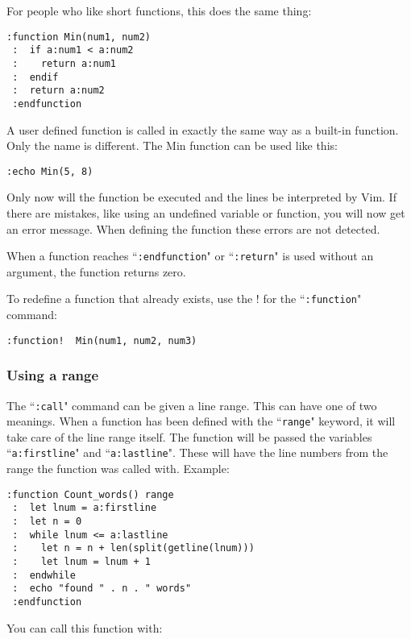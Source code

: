 For people who like short functions, this does the same thing:

\begin{Verbatim}[samepage=true]
 :function Min(num1, num2)
 :  if a:num1 < a:num2
 :    return a:num1
 :  endif
 :  return a:num2
 :endfunction
\end{Verbatim}

A user defined function is called in exactly the same way as a built-in function.
Only the name is different.
The Min function can be used like this:

\begin{Verbatim}[samepage=true]
 :echo Min(5, 8)
\end{Verbatim}

Only now will the function be executed and the lines be interpreted by Vim.
If there are mistakes, like using an undefined variable or function, you will now get an error message.
When defining the function these errors are not detected.

When a function reaches ``\texttt{:endfunction}" or ``\texttt{:return}" is used without an argument, the function returns zero.

To redefine a function that already exists, use the ! for the ``\texttt{:function}" command:

\begin{Verbatim}[samepage=true]
 :function!  Min(num1, num2, num3)
\end{Verbatim}

\subsubsection{Using a range}
The ``\texttt{:call}" command can be given a line range.
This can have one of two meanings.
When a function has been defined with the ``\texttt{range}" keyword, it will take care of the line range itself.
The function will be passed the variables ``\texttt{a:firstline}" and ``\texttt{a:lastline}".
These will have the line numbers from the range the function was called with.
Example:

\begin{Verbatim}[samepage=true]
 :function Count_words() range
 :  let lnum = a:firstline
 :  let n = 0
 :  while lnum <= a:lastline
 :    let n = n + len(split(getline(lnum)))
 :    let lnum = lnum + 1
 :  endwhile
 :  echo "found " . n . " words"
 :endfunction
\end{Verbatim}

You can call this function with:

